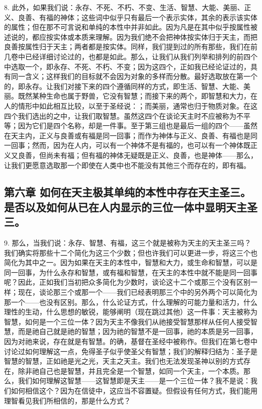 8. 此外，如果我们说：永存、不死、不朽、不变、生活、智慧、大能、美丽、正义、良善、有福的神体；这些词中似乎只有最后一个表示实体，其余的表示该实体的属性；但在那不可言说和单纯的本性中并非如此。因为凡是在其中似乎按属性被述说的，都应按实体或本质来理解。因为我们绝不会把神体按实体归于天主，而把良善按属性归于天主；两者都是按实体。同样，我们提到过的所有那些，我们在前几卷中已经详细讨论过的，也都是如此。那么，让我们从我们列举和排列的前四个中选取一个，即永存、不死、不朽、不变；因为这四个，正如我已经论证过的，具有同一含义；这样我们的目标就不会因为对象的多样而分散。最好选取放在第一个的，即永存。让我们对接下来的四个遵循同样的方式，即生活、智慧、大能、美丽。既然某种生命也属于野兽，它没有智慧；而接下来的两个，即智慧和大力，在人的情形中如此相互比较，以至于圣经说：；而美丽，通常也归于物质对象。在这四个我们选出的之中，让我们取智慧。虽然这四个在谈论天主时不应被称为不平等；因为它们是四个名称，却是一件事。至于第三组也是最后一组的四个——虽然在天主内，正义与良善或有福是同一回事；而作为神体与正义、良善、有福也是同一回事；然而，因为在人内，可以有一个神体不是有福的，也可以有一个神体既正义又良善，但尚未有福；但有福的神体无疑既是正义、良善，也是神体——那么，让我们更愿意选取那一个即使在人类中也不能没有其他三个而存在的，即有福。\par


\subsection{第六章 如何在天主极其单纯的本性中存在天主圣三。是否以及如何从已在人内显示的三位一体中显明天主圣三。}

9. 那么，当我们说：永存、智慧、有福，这三个就是被称为天主的天主圣三吗？我们确实将那些十二个简化为这三个少数；但也许我们可以更进一步，将这三个也简化为其中之一。因为如果在天主的本性中，智慧和大力，或生命和智慧，可以是同一回事，为什么永存和智慧，或有福和智慧，在天主的本性中就不能是同一回事呢？因此，正如我们当初把众多简化为少数时，谈论这十二个或那三个没有区别一样；现在，谈论那三个或那一个——我们已经表明那三个中的另外两个可以简化为那一个——也没有区别。那么，什么论证方式，什么理解的可能力量和活力，什么理性的生动，什么思想的敏锐，能够阐明（现在跳过其他）这一件事：天主被称为智慧，如何是一个三位一体？因为天主不像我们从祂接受智慧那样从任何人接受智慧，而是祂自己就是祂的智慧；因为祂的智慧不是一回事，祂的本质是另一回事，因为对祂来说，存在就是有智慧。的确，基督在圣经中被称作。但我们在第七卷中讨论过如何理解这一点，免得圣子似乎使圣父有智慧；我们的解释归结为：圣子是智慧的智慧，正如祂是光之光，天主之天主。我们也无法发现圣神以别的方式存在，除非祂自己也是智慧，并且完全是一个智慧，如同一个天主，一个本质。那么，我们如何理解这智慧——这智慧即是天主——是一个三位一体？我不是说：我们如何相信这个？因为在信徒中，这应当不容置疑。但假设有任何方式，我们能用理智看见我们所相信的，那是什么方式？\par

